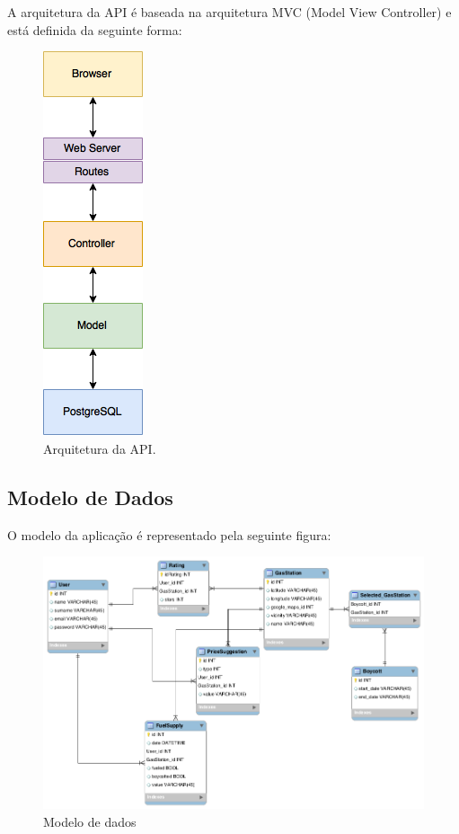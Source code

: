 A arquitetura da API é baseada na arquitetura MVC (Model View Controller) e está definida da seguinte forma:

\begin{figure}[H]
    \centering
    \includegraphics[scale=0.5]{figuras/api_arch.png}
    \caption[Arquitetura da API]{Arquitetura da API.}
    \label{img:arquitetura}
\end{figure}


\subsection{Modelo de Dados}

O modelo da aplicação é representado pela seguinte figura:

\begin{figure}[H]
    \centering
    \includegraphics[scale=0.5]{figuras/db_model.png}
    \caption[Modelo de dados]{Modelo de dados}
    \label{img:modelo_de_dados}
\end{figure}
